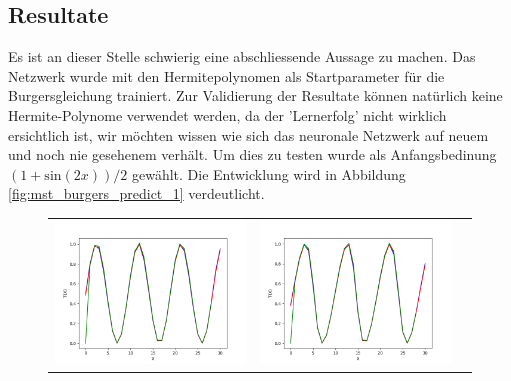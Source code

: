 \subsection{Resultate}

Es ist an dieser Stelle schwierig eine abschliessende Aussage zu machen. Das Netzwerk wurde mit den Hermitepolynomen als Startparameter für die Burgersgleichung trainiert. Zur Validierung der Resultate können natürlich keine Hermite-Polynome verwendet werden, da der 'Lernerfolg' nicht wirklich ersichtlich ist, wir möchten wissen wie sich das neuronale Netzwerk auf neuem und noch nie gesehenem verhält. Um dies zu testen wurde als Anfangsbedinung $(1 + \text{sin}(2x)) / 2$ gewählt. Die Entwicklung wird in Abbildung \ref{fig:mst_burgers_predict_1} verdeutlicht.

\begin{figure}
	\centering
	\begin{tabular}{ccc}
		\includegraphics[scale=0.27]{learning/img/burger_predict0.png} &
		\includegraphics[scale=0.27]{learning/img/burger_predict10.png} &

\end{tabular}
\end{figure}
